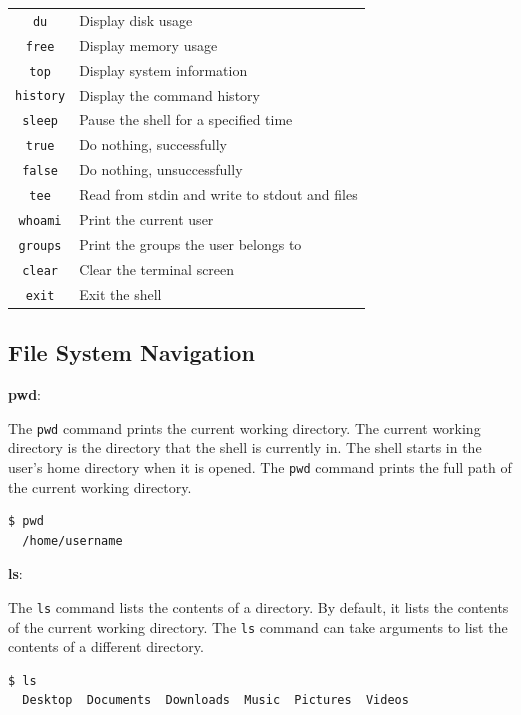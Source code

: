 \begin{table}[h!]
\begin{tabular}{ c l }
  \lstinline|du| & Display disk usage \\
  \lstinline|free| & Display memory usage \\
  \lstinline|top| & Display system information \\
  \lstinline|history| & Display the command history \\
  \lstinline|sleep| & Pause the shell for a specified time \\
  \lstinline|true| & Do nothing, successfully \\
  \lstinline|false| & Do nothing, unsuccessfully \\
  \lstinline|tee| & Read from stdin and write to stdout and files \\
  \lstinline|whoami| & Print the current user \\
  \lstinline|groups| & Print the groups the user belongs to \\
  \lstinline|clear| & Clear the terminal screen \\
  \lstinline|exit| & Exit the shell \\
  \bottomrule
\end{tabular}
\end{table}

\subsection{File System Navigation}

\textbf{pwd}:

The \lstinline|pwd| command prints the current working directory. The current working directory is the directory that the shell is currently in. The shell starts in the user's home directory when it is opened. The \lstinline|pwd| command prints the full path of the current working directory.

\begin{lstlisting}[language=bash]
  $ pwd
  /home/username
\end{lstlisting}

\textbf{ls}:

The \lstinline|ls| command lists the contents of a directory. By default, it lists the contents of the current working directory. The \lstinline|ls| command can take arguments to list the contents of a different directory.

\begin{lstlisting}[language=bash]
  $ ls
  Desktop  Documents  Downloads  Music  Pictures  Videos
\end{lstlisting}

